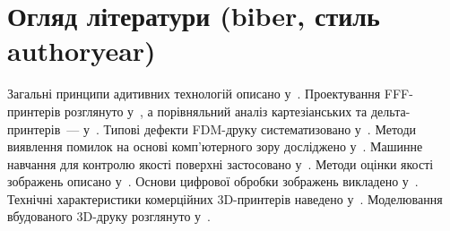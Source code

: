\documentclass[14pt]{extarticle}
\begin{document}
\section*{Огляд літератури (biber, стиль authoryear)}

Загальні принципи адитивних технологій описано у~\parencite{Gibson2021}.
Проектування FFF-принтерів розглянуто у~\parencite{Soni2021},
а порівняльний аналіз картезіанських та дельта-принтерів~--- у~\parencite{Schmitt2018}.
Типові дефекти FDM-друку систематизовано у~\parencite{Baechle2022}.
Методи виявлення помилок на основі комп'ютерного зору досліджено
у~\parencite{Baumann2016, Langeland2020, Paulsen2019}.
Машинне навчання для контролю якості поверхні застосовано у~\parencite{Kadam2021}.
Методи оцінки якості зображень описано у~\parencite{Crete2007, Wang2005}.
Основи цифрової обробки зображень викладено у~\parencite{Gonzalez2018}.
Технічні характеристики комерційних 3D-принтерів наведено у~\parencite{BambuLabA1Mini}.
Моделювання вбудованого 3D-друку розглянуто у~\parencite{VanDriel2025}.

\nocite{*}

\printbibliography[title={Список використаних джерел}]
\end{document}
